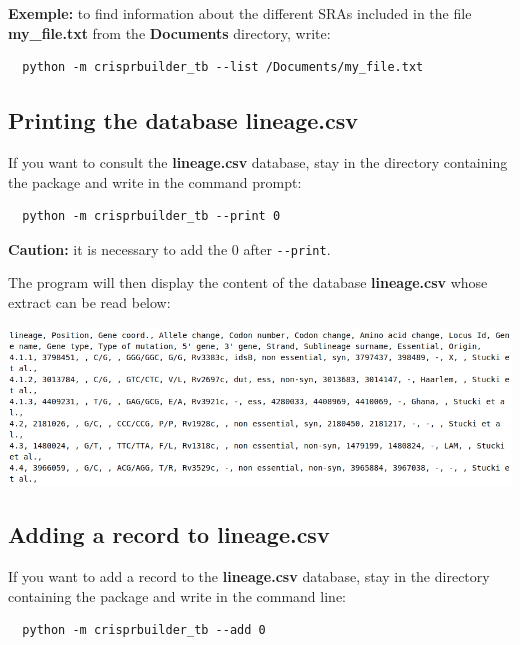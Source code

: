 \documentclass[twoside,a4paper,11pt,frenchb,openany]{report}
\begin{document}
    \textbf{Exemple:} to find information about the different SRAs included
in the file \textbf{my\_file.txt} from the \textbf{Documents} directory,
write:

    \begin{verbatim}
  python -m crisprbuilder_tb --list /Documents/my_file.txt
\end{verbatim}



    \subsection{Printing the database
lineage.csv}\label{printing-the-database-lineage.csv}

    If you want to consult the \textbf{lineage.csv} database, stay in the
directory containing the package and write in the command prompt:

    \begin{verbatim}
  python -m crisprbuilder_tb --print 0
\end{verbatim}

    \textbf{Caution:} it is necessary to add the 0 after \texttt{-\/-print}.

The program will then display the content of the database
\textbf{lineage.csv} whose extract can be read below:

\includegraphics[width=16cm]{img_01.png}



    \subsection{Adding a record to
lineage.csv}\label{adding-a-record-to-lineage.csv}

    If you want to add a record to the \textbf{lineage.csv} database, stay
in the directory containing the package and write in the command line:

    \begin{verbatim}
  python -m crisprbuilder_tb --add 0
\end{verbatim}
\end{document}
